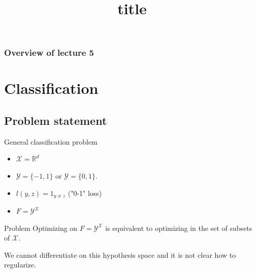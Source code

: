 \documentclass[usenames,dvipsnames]{beamer}
\title[FTML]{title}
\date{} %
\begin{document}
\begin{frame}
\titlepage %
\end{frame}

\begin{frame}
\frametitle{Overview of lecture 5} %
\tableofcontents %
\end{frame}

\section{Classification}%
\frame{\tableofcontents[currentsection]}
\label{sec:classification}

\subsection{Problem statement}%
\label{sub:problem_statement}

\begin{frame}{General classification problem}

    \begin{itemize}
        \item $ \mathcal{X} = \mathbb{R}^d$
	\item $ \mathcal{Y}  = \{-1, 1\}$ or $ \mathcal{Y}  = \{0, 1\}$.
	\item $l(y,z) = 1_{y\neq z}$ ("0-1" loss)
	\item $F = \mathcal{Y}^{ \mathcal{X} }$
    \end{itemize}
\end{frame}

\begin{frame}{Problem}
    Optimizing on $ F = \mathcal{Y}^{ \mathcal{X} }$ is equivalent to optimizing in the set of subsets of $ \mathcal{X}$.
    
    We cannot differentiate on this hypothesis space and it is not clear how to regularize.
\end{frame}
\end{document}
